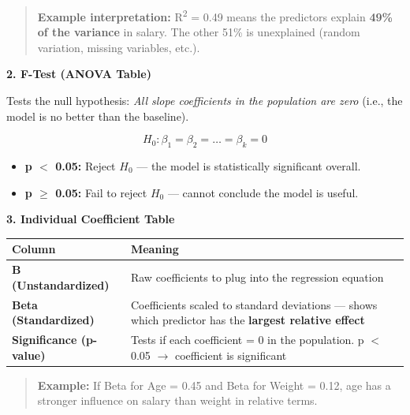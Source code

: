 \documentclass[12pt,openany]{book}
\begin{document}
\begin{quote}
\textbf{Example interpretation:} R\textsuperscript{2} = 0.49 means the predictors explain \textbf{49\% of the variance} in salary. The other 51\% is unexplained (random variation, missing variables, etc.).
\end{quote}


\textbf{2. F-Test (ANOVA Table)}

Tests the null hypothesis: \textit{All slope coefficients in the population are zero} (i.e., the model is no better than the baseline).

\[
H_0: \beta_1 = \beta_2 = \dots = \beta_k = 0
\]


\begin{itemize}[leftmargin=*]
    \item \textbf{p \(<\) 0.05:} Reject \(H_0\) --- the model is statistically significant overall.
    \item \textbf{p \(\geq\) 0.05:} Fail to reject \(H_0\) --- cannot conclude the model is useful.

\end{itemize}

\textbf{3. Individual Coefficient Table}

\begin{center}
\small
\renewcommand{\arraystretch}{1.15}
\begin{tabular}{|L{0.28\textwidth}|L{0.60\textwidth}|}
\hline
    Column & Meaning \\
\hline
    \textbf{B (Unstandardized)} & Raw coefficients to plug into the regression equation \\
\hline
    \textbf{Beta (Standardized)} & Coefficients scaled to standard deviations --- shows which predictor has the \textbf{largest relative effect} \\
\hline
    \textbf{Significance (p-value)} & Tests if each coefficient = 0 in the population. p \(<\) 0.05 \(\rightarrow\) coefficient is significant \\
\hline
\end{tabular}
\end{center}
\normalsize


\begin{quote}
\textbf{Example:} If Beta for Age = 0.45 and Beta for Weight = 0.12, age has a stronger influence on salary than weight in relative terms.
\end{quote}


\medskip
\end{document}
